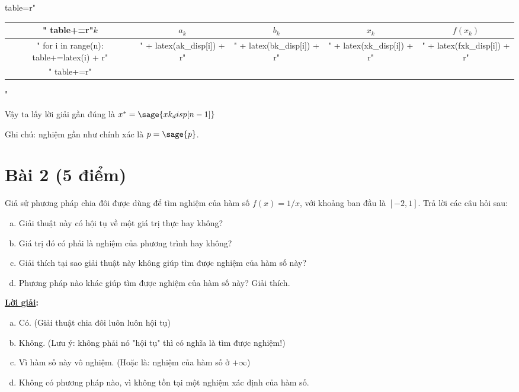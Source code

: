 \documentclass[12pt]{article}
\newcommand{\Solution}{
\medskip
{\bf \underline{Lời giải}:}
}
\begin{document}
\begin{sagesilent}
table=r"\begin{tabular}{c|cccc}"
table+=r"$k$ & $a_k$ & $b_k$ & $x_k$ & $f(x_k)$ \\ \hline"
for i in range(n):
  table+=latex(i) + r"&" + latex(ak_disp[i]) + r"&" + latex(bk_disp[i]) + r"&" + latex(xk_disp[i]) + r"&" + latex(fxk_disp[i]) + r"\\"
table+=r"\end{tabular}"
\end{sagesilent}

\begin{center}
\end{center}

Vậy ta lấy lời giải gần đúng là $x^*=\sage{xk_disp[n-1]}$

Ghi chú: nghiệm gần như chính xác là $p=\sage{p}$.

\section{Bài 2 (5 điểm)}
Giả sử phương pháp chia đôi được dùng để tìm nghiệm của hàm số $f(x) = 1/x$, với khoảng ban đầu là $[-2,1]$. Trả lời các câu hỏi sau:
\begin{enumerate}[a)]
 \item Giải thuật này có hội tụ về một giá trị thực hay không?
 \item Giá trị đó có phải là nghiệm của phương trình hay không?
 \item Giải thích tại sao giải thuật này không giúp tìm được nghiệm của hàm số này?
 \item Phương pháp nào khác giúp tìm được nghiệm của hàm số này? Giải thích.
\end{enumerate}

\Solution

\begin{enumerate}[a)]
 \item Có. (Giải thuật chia đôi luôn luôn hội tụ)
 \item Không. (Lưu ý: không phải nó "hội tụ" thì có nghĩa là tìm được nghiệm!)
 \item Vì hàm số này vô nghiệm. (Hoặc là: nghiệm của hàm số ở $+\infty$)
 \item Không có phương pháp nào, vì không tồn tại một nghiệm xác định của hàm số.
\end{enumerate}
\end{document}
